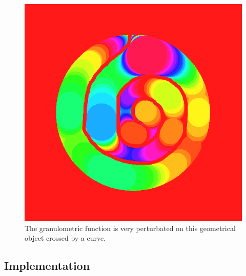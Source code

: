 \begin{figure}[!ht]
\begin{center}
\begin{minipage}[c]{.46\linewidth}
    		\includegraphics[scale=0.2]{images/device9-6-granulo.png}
    	\end{minipage}
	\end{center}
	\label{device9-6}
	\caption{The granulometric function is very perturbated on this geometrical object crossed by a curve.}
\end{figure}

\subsection{Implementation}



